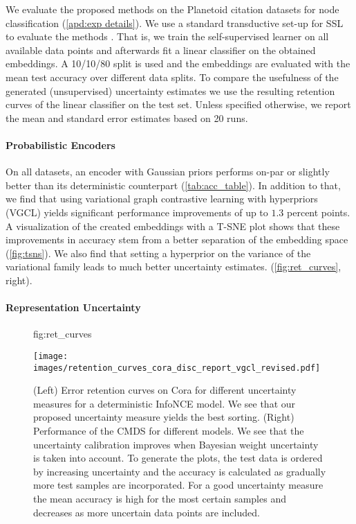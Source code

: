 \documentclass[tablecaption=bottom,wcp]{jmlr} %
\begin{document}
We evaluate the proposed methods on the Planetoid citation datasets for node classification (\cref{apd:exp details}). We use a standard transductive set-up for SSL to evaluate the methods \citep{liu2021}. That is, we train the self-supervised learner on all available data points and afterwards fit a linear classifier on the obtained embeddings. A 10/10/80 split is used and the embeddings are evaluated with the mean test accuracy over different data splits. To compare the usefulness of the generated (unsupervised) uncertainty estimates we use the resulting retention curves of the linear classifier on the test set. Unless specified otherwise, we report the mean and standard error estimates based on 20 runs. 




\paragraph{Probabilistic Encoders}

On all datasets, an encoder with Gaussian priors performs on-par or slightly better than its deterministic counterpart (\cref{tab:acc_table}). In addition to that, we find that using variational graph contrastive learning with hyperpriors (VGCL) yields significant performance improvements of up to $1.3$ percent points.  A visualization of the created embeddings with a T-SNE plot shows that these improvements in accuracy stem from a better separation of the embedding space (\cref{fig:tsns}). We also find that setting a hyperprior on the variance of the variational family leads to much better uncertainty estimates. (\cref{fig:ret_curves}, right). 



\paragraph{Representation Uncertainty}



\begin{figure}[t]
\floatconts
  {fig:ret_curves}
  {\caption{(Left) Error retention curves on Cora for different uncertainty measures for a deterministic InfoNCE model. We see that our proposed uncertainty measure yields the best sorting. (Right) Performance of the CMDS for different models. We see that the uncertainty calibration improves when Bayesian weight uncertainty is taken into account. To generate the plots, the test data is ordered by increasing uncertainty and the accuracy is calculated as gradually more test samples are incorporated. For a good uncertainty measure the mean accuracy is high for the most certain samples and decreases as more uncertain data points are included.}}
{\texttt{[image: images/retention\_curves\_cora\_disc\_report\_vgcl\_revised.pdf]}}
\end{figure}
\end{document}
